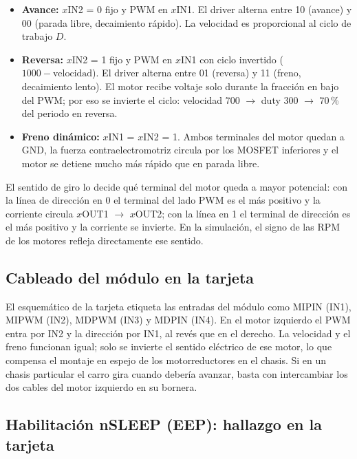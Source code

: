 \begin{itemize}
  \item \textbf{Avance:} $x$IN2 = 0 fijo y PWM en $x$IN1. El driver alterna
        entre 10 (avance) y 00 (parada libre, decaimiento rápido). La velocidad
        es proporcional al ciclo de trabajo $D$.
  \item \textbf{Reversa:} $x$IN2 = 1 fijo y PWM en $x$IN1 con ciclo invertido
        ($1000 - \text{velocidad}$). El driver alterna entre 01 (reversa) y 11
        (freno, decaimiento lento). El motor recibe voltaje solo durante la
        fracción en bajo del PWM; por eso se invierte el ciclo: velocidad 700
        $\rightarrow$ duty 300 $\rightarrow$ 70\,\% del periodo en reversa.
  \item \textbf{Freno dinámico:} $x$IN1 = $x$IN2 = 1. Ambos terminales del
        motor quedan a GND, la fuerza contraelectromotriz circula por los
        MOSFET inferiores y el motor se detiene mucho más rápido que en parada
        libre.
\end{itemize}

El sentido de giro lo decide qué terminal del motor queda a mayor potencial:
con la línea de dirección en 0 el terminal del lado PWM es el más positivo y la
corriente circula $x$OUT1 $\rightarrow$ $x$OUT2; con la línea en 1 el terminal
de dirección es el más positivo y la corriente se invierte. En la simulación,
el signo de las RPM de los motores refleja directamente ese sentido.

\subsection{Cableado del módulo en la tarjeta}

El esquemático de la tarjeta etiqueta las entradas del módulo como MIPIN
(IN1), MIPWM (IN2), MDPWM (IN3) y MDPIN (IN4). En el motor izquierdo el PWM
entra por IN2 y la dirección por IN1, al revés que en el derecho. La velocidad
y el freno funcionan igual; solo se invierte el sentido eléctrico de ese motor,
lo que compensa el montaje en espejo de los motorreductores en el chasis. Si en
un chasis particular el carro gira cuando debería avanzar, basta con
intercambiar los dos cables del motor izquierdo en su bornera.

\subsection{Habilitación nSLEEP (EEP): hallazgo en la tarjeta}
\label{sec:eep}


